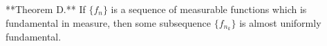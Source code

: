 **Theorem D.** If $\{f_n\}$ is a sequence of measurable functions which is fundamental in measure, then some subsequence $\{f_{n_k}\}$ is almost uniformly fundamental.
